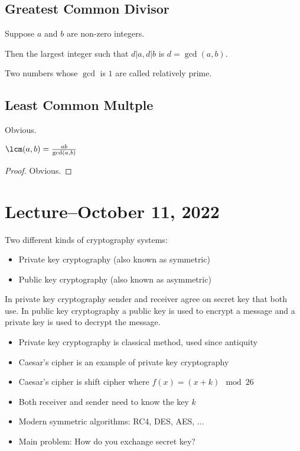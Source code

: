 \documentclass{scrreprt}
\begin{document}
\subsection{Greatest Common Divisor}

Suppose $a$ and $b$ are non-zero integers.

Then the largest integer such that $d|a, d|b$ is $d = \gcd(a, b)$.

Two numbers whose $\gcd$ is $1$ are called relatively prime.

\subsection{Least Common Multple}

Obvious.

\begin{theorem}
    $\lcm(a, b) = \frac{ab}{\gcd(a, b)}$
    \begin{proof}
        Obvious.
    \end{proof}
\end{theorem}

\section{Lecture--October 11, 2022}

Two different kinds of cryptography systems:
\begin{itemize}
    \item Private key cryptography (also known as symmetric)
    \item Public key cryptography (also known as asymmetric)
\end{itemize}

In private key cryptography sender and receiver agree on secret key that both use.
In public key cryptography a public key is used to encrypt a message and a private key is used to decrypt the message.

\begin{itemize}
    \item Private key cryptography is classical method, used since antiquity
    \item Caesar's cipher is an example of private key cryptography
    \item Caesar's cipher is shift cipher where $f(x) = (x + k) \mod 26$
    \item Both receiver and sender need to know the key $k$
    \item Modern symmetric algorithms: RC4, DES, AES, ...
    \item Main problem: How do you exchange secret key?
\end{itemize}
\end{document}
